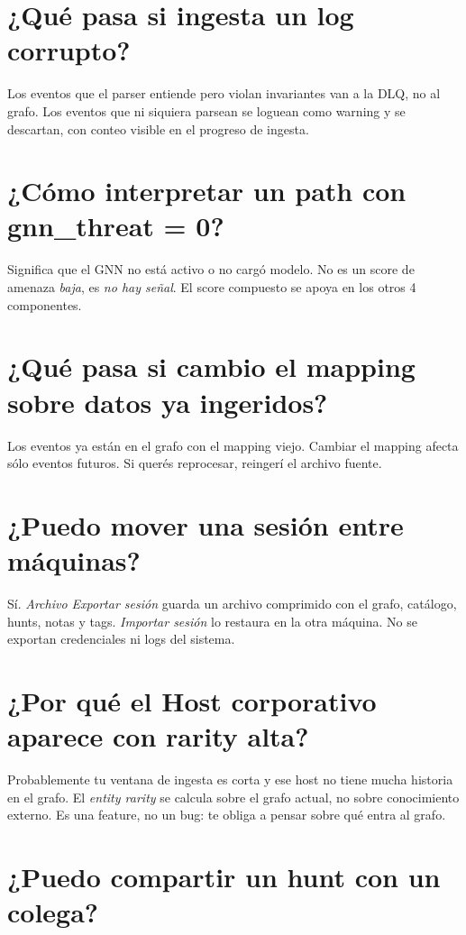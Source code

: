 \section{¿Qué pasa si ingesta un log corrupto?}

Los eventos que el parser entiende pero violan invariantes van a
la DLQ, no al grafo. Los eventos que ni siquiera parsean se loguean
como warning y se descartan, con conteo visible en el progreso de
ingesta.

\section{¿Cómo interpretar un path con gnn\_threat = 0?}

Significa que el GNN no está activo o no cargó modelo. No es un
score de amenaza \emph{baja}, es \emph{no hay señal}. El score
compuesto se apoya en los otros 4 componentes.

\section{¿Qué pasa si cambio el mapping sobre datos ya ingeridos?}

Los eventos ya están en el grafo con el mapping viejo. Cambiar el
mapping afecta sólo eventos futuros. Si querés reprocesar,
reingerí el archivo fuente.

\section{¿Puedo mover una sesión entre máquinas?}

Sí. \emph{Archivo \textrightarrow{} Exportar sesión} guarda un
archivo comprimido con el grafo, catálogo, hunts, notas y tags.
\emph{Importar sesión} lo restaura en la otra máquina. No se
exportan credenciales ni logs del sistema.

\section{¿Por qué el Host corporativo aparece con rarity alta?}

Probablemente tu ventana de ingesta es corta y ese host no tiene
mucha historia en el grafo. El \emph{entity rarity} se calcula
sobre el grafo actual, no sobre conocimiento externo. Es una
feature, no un bug: te obliga a pensar sobre qué entra al grafo.

\section{¿Puedo compartir un hunt con un colega?}

